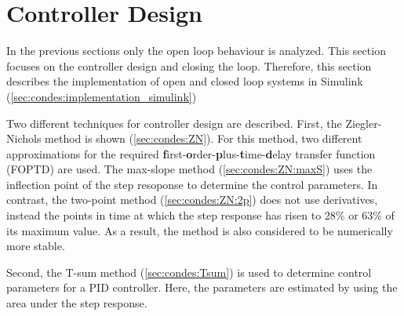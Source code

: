 \section{Controller Design} \label{sec:condes}

In the previous sections only the open loop behaviour is analyzed.
This section focuses on the controller design and closing the loop.
Therefore, this section describes the implementation of open and closed loop systems in Simulink (\autoref{sec:condes:implementation_simulink})

Two different techniques for controller design are described.
First, the Ziegler-Nichols method is shown (\autoref{sec:condes:ZN}).
For this method, two different approximations for the required \textbf{f}irst-\textbf{o}rder-\textbf{p}lus-\textbf{t}ime-\textbf{d}elay transfer function (FOPTD) are used.
The max-slope method (\autoref{sec:condes:ZN:maxS}) uses the inflection point of the step resoponse to determine the control parameters.
In contrast, the two-point method (\autoref{sec:condes:ZN:2p}) does not use derivatives, instead the points in time at which the step response has risen to 28\% or 63\% of its maximum value.
As a result, the method is also considered to be numerically more stable.

Second, the T-sum method (\autoref{sec:condes:Tsum}) is used to determine control parameters for a PID controller.
Here, the parameters are estimated by using the area under the step response.


